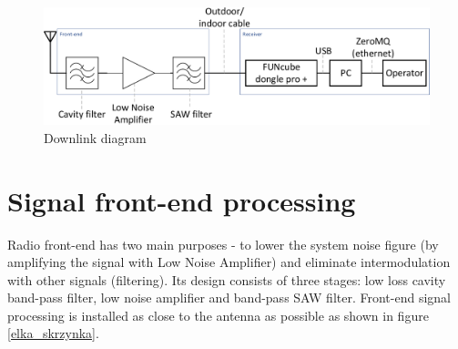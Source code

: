 \begin{figure}[H]
    \centering
    \includegraphics[width=0.8\paperwidth]{img/7/downlink_diagram.pdf}
    \caption{Downlink diagram}
    \label{downlink_diagram}
\end{figure}

\section{Signal front-end processing}
Radio front-end has two main purposes - to lower the system noise figure (by amplifying the signal with Low Noise Amplifier) and eliminate intermodulation with other signals (filtering). Its design consists of three stages: low loss cavity band-pass filter, low noise amplifier and band-pass SAW filter. Front-end signal processing is installed as close to the antenna as possible as shown in figure \ref{elka_skrzynka}.

